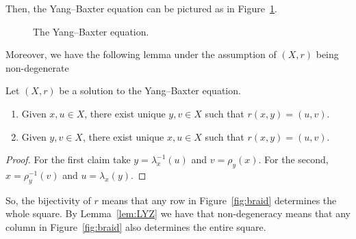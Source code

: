     Then, the Yang--Baxter equation can be pictured as in Figure~\ref{fig:YangBaxter}.

    \begin{figure}
        \centering
        \hspace{.5cm}
        \caption{The Yang--Baxter equation.}
        \label{fig:YangBaxter}
    \end{figure}

    Moreover, we have the following lemma under the assumption of $(X,r)$ being non-degenerate 
    
    \begin{lemma}
    \label{lem:LYZ}
        Let $(X,r)$ be a solution to the Yang--Baxter equation. 
        \begin{enumerate}
            \item Given $x,u\in X$, there exist unique $y,v\in X$ such that $r(x,y)=(u,v)$. 
            \item Given $y,v\in X$, there exist unique $x,u\in X$ such that $r(x,y)=(u,v)$. 
        \end{enumerate}
    \end{lemma}
    \begin{proof}
        For the first claim take $y=\lambda_x^{-1}(u)$ and $v=\rho_y(x)$. 
        For the second, $x=\rho_y^{-1}(v)$ and $u=\lambda_x(y)$. 
    \end{proof}

    So, the bijectivity of $r$ means that any row in Figure~\ref{fig:braid} determines the whole square. By Lemma~\ref{lem:LYZ} we have that non-degeneracy means that any column in Figure~\ref{fig:braid} also determines the entire square. 

